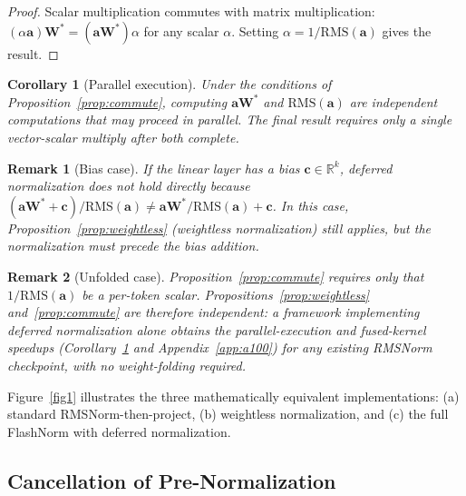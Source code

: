 \documentclass{article}
\newtheorem{corollary}{Corollary}
\newtheorem{remark}{Remark}
\begin{document}
\begin{proof}
Scalar multiplication commutes with matrix multiplication:
$(\alpha \mathbf{a})\mathbf{W}^* = (\mathbf{a}\mathbf{W}^*) \alpha$ for any scalar
$\alpha$. Setting $\alpha = 1/\mathrm{RMS}(\mathbf{a})$ gives the result.
\end{proof}

\begin{corollary}[Parallel execution]\label{cor:parallel}
Under the conditions of Proposition~\ref{prop:commute}, computing
$\mathbf{a}\mathbf{W}^*$ and $\mathrm{RMS}(\mathbf{a})$ are \emph{independent}
computations that may proceed in parallel. The final result requires only a single
vector-scalar multiply after both complete.
\end{corollary}

\begin{remark}[Bias case]
If the linear layer has a bias $\mathbf{c} \in \mathbb{R}^k$, deferred normalization
does not hold directly because
$(\mathbf{a}\mathbf{W}^* + \mathbf{c}) / \mathrm{RMS}(\mathbf{a}) \neq
 \mathbf{a}\mathbf{W}^*/\mathrm{RMS}(\mathbf{a}) + \mathbf{c}$.
In this case, Proposition~\ref{prop:weightless} (weightless normalization) still
applies, but the normalization must precede the bias addition.
\end{remark}

\begin{remark}[Unfolded case]
Proposition~\ref{prop:commute} requires only that $1/\mathrm{RMS}(\mathbf{a})$ be a per-token scalar. Propositions~\ref{prop:weightless} and~\ref{prop:commute} are therefore independent: a framework implementing deferred normalization alone obtains the parallel-execution and fused-kernel speedups (Corollary~\ref{cor:parallel} and Appendix~\ref{app:a100}) for any existing RMSNorm checkpoint, with no weight-folding required.
\end{remark}

Figure~\ref{fig1} illustrates the three mathematically equivalent
implementations: (a) standard RMSNorm-then-project, (b) weightless normalization,
and (c) the full FlashNorm with deferred normalization.

\subsection{Cancellation of Pre-Normalization}\label{sec:rms-cancel}
\end{document}
